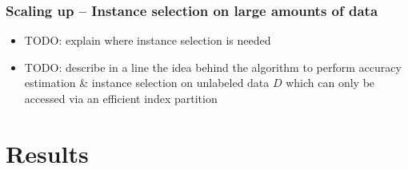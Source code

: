 \documentclass[11pt]{beamer}
\newlength{\wideitemsep}
\let\olditem\item
\renewcommand{\item}{\setlength{\itemsep}{\wideitemsep}\olditem}
\begin{document}
\begin{frame}
\frametitle{Scaling up -- Instance selection on large amounts of data} 
\begin{itemize}
\item TODO: explain where instance selection is needed
\item TODO: describe in a line the idea behind the algorithm to perform accuracy estimation \& instance selection on unlabeled data $D$ which can only be accessed via an efficient index partition 
\end{itemize}
\end{frame}

\section{Results}
\end{document}
